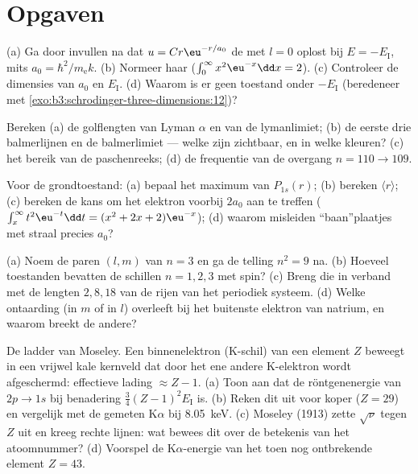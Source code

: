 \section{Opgaven}

\begin{exercise}[$\star$]\label{exo:b3:hydrogen-atom:1}
(a) Ga door invullen na dat $u = Cr\eu^{-r/a_0}$ de 
met $l = 0$ oplost bij $E = -E_{\text{I}}$, mits $a_0 =
\hbar^2/m_{\text{e}}k$. (b) Normeer haar ($\int_0^\infty
x^2\eu^{-x}\dd x = 2$). (c) Controleer de dimensies van $a_0$ en
$E_{\text{I}}$. (d) Waarom is er geen toestand onder $-E_{\text{I}}$
(beredeneer met \cref{exo:b3:schrodinger-three-dimensions:12})?
\end{exercise}

\begin{exercise}[$\star$]\label{exo:b3:hydrogen-atom:2}
Bereken (a) de golflengten van Lyman $\alpha$ en van de lymanlimiet; (b)
de eerste drie balmerlijnen en de balmerlimiet --- welke zijn zichtbaar,
en in welke kleuren? (c) het bereik van de paschenreeks; (d) de frequentie
van de overgang $n = 110 \to 109$.
\end{exercise}

\begin{exercise}[$\star$]\label{exo:b3:hydrogen-atom:3}
Voor de grondtoestand: (a) bepaal het maximum van $P_{1s}(r)$; (b)
bereken $\langle r\rangle$; (c) bereken de kans om het elektron voorbij
$2a_0$ aan te treffen ($\int_x^\infty t^2\eu^{-t}\dd t = (x^2 +
2x + 2)\eu^{-x}$); (d) waarom misleiden ``baan''plaatjes met straal precies
$a_0$?
\end{exercise}

\begin{exercise}[$\star$]\label{exo:b3:hydrogen-atom:4}
(a) Noem de paren $(l, m)$ van $n = 3$ en ga de telling $n^2 =
9$ na. (b)
Hoeveel toestanden bevatten de schillen $n = 1, 2, 3$ met spin? (c) Breng
die in verband met de lengten $2, 8, 18$ van de rijen van het periodiek
systeem. (d) Welke ontaarding (in $m$ of in $l$) overleeft bij het
buitenste elektron van natrium, en waarom breekt de andere?
\end{exercise}

\begin{exercise}[$\star\star$]\label{exo:b3:hydrogen-atom:5}
De ladder van Moseley. Een binnenelektron (K-schil) van een element $Z$
beweegt in een vrijwel kale kernveld dat door het ene andere K-elektron
wordt afgeschermd: effectieve lading $\approx Z - 1$. (a) Toon aan dat de
röntgenenergie van $2p \to 1s$ bij benadering
$\tfrac34(Z-1)^2E_{\text{I}}$ is. (b) Reken dit uit voor koper ($Z = 29$)
en vergelijk met de gemeten K$\alpha$ bij \qty{8.05}{keV}. (c) Moseley
(1913) zette $\sqrt{\nu}$ tegen $Z$ uit en kreeg rechte lijnen: wat
bewees dit over de betekenis van het atoomnummer? (d) Voorspel de
K$\alpha$-energie van het toen nog ontbrekende element $Z = 43$.
\end{exercise}

